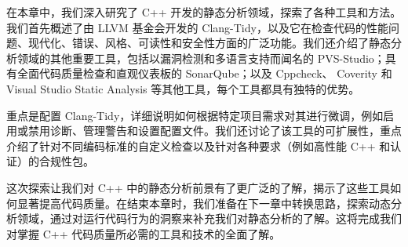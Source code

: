 
在本章中，我们深入研究了 C++ 开发的静态分析领域，探索了各种工具和方法。我们首先概述了由 LLVM 基金会开发的 Clang-Tidy，以及它在检查代码的性能问题、现代化、错误、风格、可读性和安全性方面的广泛功能。我们还介绍了静态分析领域的其他重要工具，包括以漏洞检测和多语言支持而闻名的 PVS-Studio；具有全面代码质量检查和直观仪表板的 SonarQube；以及 Cppcheck、 Coverity 和 Visual Studio Static Analysis 等其他工具，每个工具都具有独特的优势。

重点是配置 Clang-Tidy，详细说明如何根据特定项目需求对其进行微调，例如启用或禁用诊断、管理警告和设置配置文件。我们还讨论了该工具的可扩展性，重点介绍了针对不同编码标准的自定义检查以及针对各种要求（例如高性能 C++ 和认证）的合规性包。

这次探索让我们对 C++ 中的静态分析前景有了更广泛的了解，揭示了这些工具如何显著提高代码质量。在结束本章时，我们准备在下一章中转换思路，探索动态分析领域，通过对运行代码行为的洞察来补充我们对静态分析的了解。这将完成我们对掌握 C++ 代码质量所必需的工具和技术的全面了解。